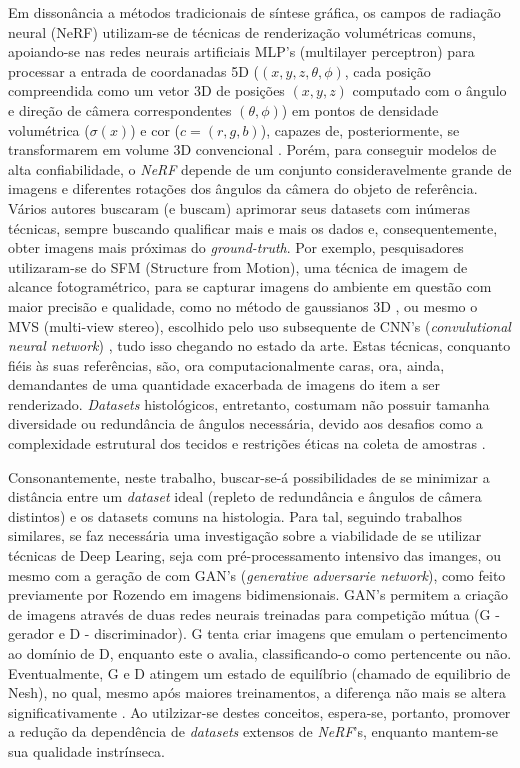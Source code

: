 Em dissonância a métodos tradicionais de síntese gráfica, os campos de radiação neural (NeRF) utilizam-se de técnicas de renderização volumétricas comuns, apoiando-se nas redes neurais artificiais MLP's (multilayer perceptron) para processar a entrada de coordanadas 5D ($(x, y, z, \theta, \phi)$, cada posição compreendida como um vetor 3D de posições $(x, y, z)$ computado com o ângulo e direção de câmera correspondentes $(\theta, \phi)$) em pontos de densidade volumétrica ($\sigma (x)$) e cor ($c = (r, g, b)$), capazes de, posteriormente, se transformarem em volume 3D convencional \cite{mildenhall2020nerfrepresentingscenesneural}. Porém, para conseguir modelos de alta confiabilidade, o \textit{NeRF} depende de um conjunto consideravelmente grande de imagens e diferentes rotações dos ângulos da câmera do objeto de referência. Vários autores buscaram (e buscam) aprimorar seus datasets com inúmeras técnicas, sempre buscando qualificar mais e mais os dados e, consequentemente, obter imagens mais próximas do \textit{ground-truth}. Por exemplo, pesquisadores utilizaram-se do SFM  (Structure from Motion), uma técnica de imagem de alcance fotogramétrico, para se capturar imagens do ambiente em questão com maior precisão e qualidade, como no método de gaussianos 3D \cite{kerbl3Dgaussians}, ou mesmo o MVS (multi-view stereo), escolhido pelo uso subsequente de CNN's (\textit{convulutional neural network}) \cite{chen2021mvsnerffastgeneralizableradiance}, tudo isso chegando no estado da arte. Estas técnicas, conquanto fiéis às suas referências, são, ora computacionalmente caras, ora, ainda, demandantes de uma quantidade exacerbada de imagens do item a ser renderizado. \textit{Datasets} histológicos, entretanto, costumam não possuir tamanha diversidade ou redundância de ângulos necessária, devido aos desafios como a complexidade estrutural dos tecidos e restrições éticas na coleta de amostras \cite{XUE2021101816}.

Consonantemente, neste trabalho, buscar-se-á possibilidades de se minimizar a distância entre um \textit{dataset} ideal (repleto de redundância e ângulos de câmera distintos) e os datasets comuns na histologia. Para tal, seguindo trabalhos similares, se faz necessária uma investigação sobre a viabilidade de se utilizar técnicas de Deep Learing, seja com pré-processamento intensivo das imanges, ou mesmo com a geração de com GAN's (\textit{generative adversarie network}), como feito previamente por Rozendo \cite{rozendo2024histdataaug} em imagens bidimensionais. GAN's  permitem a criação de imagens através de duas redes neurais treinadas para competição mútua (G - gerador e  D - discriminador). G tenta criar imagens que emulam o pertencimento ao domínio de D, enquanto este o avalia, classificando-o como pertencente ou não. Eventualmente, G e D atingem um estado de equilíbrio (chamado de equilibrio de Nesh), no qual, mesmo após maiores treinamentos, a diferença não mais se altera significativamente \cite{goodfellow2014generativeadversarialnetworks} . Ao utilzizar-se destes conceitos, espera-se, portanto, promover a redução da dependência de \textit{datasets} extensos de \textit{NeRF}'s, enquanto mantem-se sua qualidade instrínseca.
